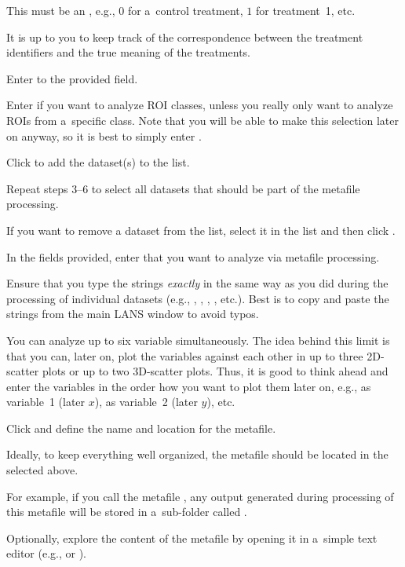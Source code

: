 \nb
\bul This must be an , e.g., $0$ for a~control treatment, $1$ for treatment~1, etc.

\bul It is up to you to keep track of the correspondence between the treatment identifiers and the true meaning of the treatments.

\s Enter  to the provided field.

\nb
\bul Enter \ttt{*} if you want to analyze  ROI classes, unless you really only want to analyze ROIs from a~specific class. Note that you will be able to make this selection later on anyway, so it is best to simply enter \ttt{*}.

\s Click  to add the dataset(s) to the list. 

\s Repeat steps 3--6 to select all datasets that should be part of the metafile processing.

\nb
\bul If you want to remove a dataset from the list, select it in the list and then click .

\s In the fields provided, enter  that you want to analyze via metafile processing. 

\nb
\bul Ensure that you type the strings \emph{exactly} in the same way as you did during the processing of individual datasets (e.g., , , , , etc.). Best is to copy and paste the strings from the main LANS window to avoid typos.

\bul You can analyze up to six variable simultaneously. The idea behind this limit is that you can, later on, plot the variables against each other in up to three 2D-scatter plots or up to two 3D-scatter plots. Thus, it is good to think ahead and enter the variables in the order how you want to plot them later on, e.g.,  as variable~1 (later $x$),  as variable~2 (later $y$), etc.

\s Click  and define the name and location for the metafile.

\nb
\bul Ideally, to keep everything well organized, the metafile should be located in the  selected above. 

\bul For example, if you call the metafile , any output generated during processing of this metafile will be stored in a~sub-folder called .

\s Optionally, explore the content of the metafile by opening it in a~simple text editor (e.g.,  or ).

